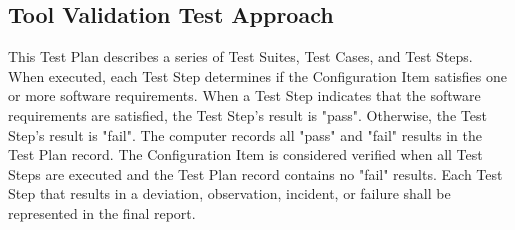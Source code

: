 \subsection{Tool Validation Test Approach}
This Test Plan describes a series of Test Suites, Test Cases, and Test Steps.
When executed, each Test Step determines if the Configuration Item satisfies one
or more software requirements.  When a Test Step indicates that the software
requirements are satisfied, the Test Step's result is "pass".  Otherwise, the
Test Step's result is "fail".  The computer records all "pass" and "fail"
results in the Test Plan record.  The Configuration Item is considered
verified when all Test Steps are executed and the Test Plan record contains
no "fail" results.  Each Test Step that results in a deviation, observation,
incident, or failure shall be represented in the final report.

